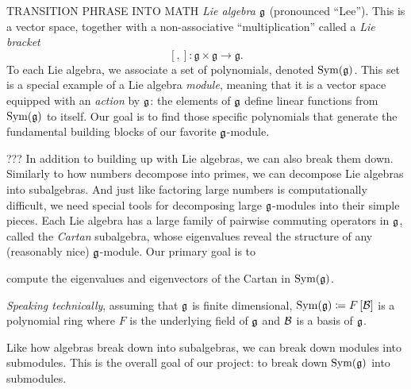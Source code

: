 \documentclass[11pt, reqno]{amsart}
\begin{document}
TRANSITION PHRASE INTO MATH
 \emph{Lie algebra} $\mathfrak{g}$ (pronounced ``Lee''). This is a vector space, together with a non-associative ``multiplication'' called a \emph{Lie bracket}
\[[,]: \mathfrak{g} \times \mathfrak{g} \rightarrow \mathfrak{g}.\]
To each Lie algebra, we associate a set of polynomials, denoted $\operatorname{Sym}(\mathfrak{g})$. This set is a special example of a Lie algebra \emph{module}, meaning that it is a vector space equipped with an \emph{action} by $\mathfrak{g}$: the elements of $\mathfrak{g}$ define linear functions from $\operatorname{Sym}(\mathfrak{g})$ to itself. Our goal is to find those specific polynomials that generate the fundamental building blocks of our favorite $\mathfrak{g}$-module.


??? In addition to building up with Lie algebras, we can also break them down.
Similarly to how numbers decompose into primes, we can decompose Lie algebras
into subalgebras. And just like factoring large numbers is computationally difficult, we need special tools for decomposing large $\mathfrak{g}$-modules into their simple pieces. Each Lie algebra has a 
large family of pairwise commuting operators in $\mathfrak{g}$, called the \emph{Cartan} subalgebra, whose eigenvalues reveal the structure of any (reasonably nice) $\mathfrak{g}$-module. Our primary goal is to 
\begin{center} compute the eigenvalues and eigenvectors of the Cartan in $\operatorname{Sym}(\mathfrak{g})$. \end{center}




%
%

%
%
%

\emph{Speaking technically}, assuming that $\mathfrak{g}$ is finite dimensional, $\operatorname{Sym}(\mathfrak{g})\coloneqq F\left[ \mathcal{B} \right]$ 
is a polynomial ring where $F$ is the underlying field of $\mathfrak{g}$ and $\mathcal{B}$ is a basis of $\mathfrak{g}$.



Like how algebras break down into subalgebras, we can break down modules into
submodules. This is the overall goal of our project: to break down $\operatorname{Sym}(\mathfrak{g})$
into submodules.
\end{document}
